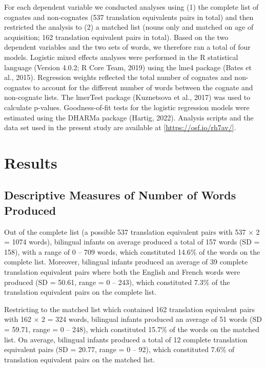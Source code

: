 \documentclass[
  english,
  ,man,floatsintext]{apa6}
\begin{document}
For each dependent variable we conducted analyses using (1) the complete list of cognates and non-cognates (537 translation equivalents pairs in total) and then restricted the analysis to (2) a matched list (nouns only and matched on age of acquisition; 162 translation equivalent pairs in total). Based on the two dependent variables and the two sets of words, we therefore ran a total of four models. Logistic mixed effects analyses were performed in the R statistical language (Version 4.0.2; R Core Team, 2019) using the lme4 package (Bates et al., 2015). Regression weights reflected the total number of cognates and non-cognates to account for the different number of words between the cognate and non-cognate lists. The lmerTest package (Kuznetsova et al., 2017) was used to calculate p-values. Goodness-of-fit tests for the logistic regression models were estimated using the DHARMa package (Hartig, 2022). Analysis scripts and the data set used in the present study are available at {[}\url{https://osf.io/rh7av/}{]}.

\hypertarget{results}{%
\section{Results}\label{results}}

\hypertarget{descriptive-measures-of-number-of-words-produced}{%
\subsection{Descriptive Measures of Number of Words Produced}\label{descriptive-measures-of-number-of-words-produced}}

Out of the complete list (a possible 537 translation equivalent pairs with 537 × 2 = 1074 words), bilingual infants on average produced a total of 157 words (SD = 158), with a range of 0 -- 709 words, which constituted 14.6\% of the words on the complete list. Moreover, bilingual infants produced an average of 39 complete translation equivalent pairs where both the English and French words were produced (SD = 50.61, range = 0 -- 243), which constituted 7.3\% of the translation equivalent pairs on the complete list.

Restricting to the matched list which contained 162 translation equivalent pairs with 162 × 2 = 324 words, bilingual infants produced an average of 51 words (SD = 59.71, range = 0 -- 248), which constituted 15.7\% of the words on the matched list. On average, bilingual infants produced a total of 12 complete translation equivalent pairs (SD = 20.77, range = 0 -- 92), which constituted 7.6\% of translation equivalent pairs on the matched list.
\end{document}
